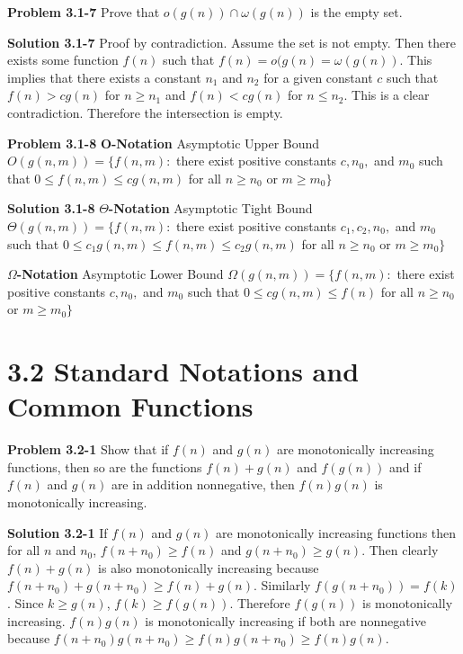 \documentclass{article}
\begin{document}
\hrulefill

\textbf{Problem 3.1-7} Prove that $o(g(n)) \cap \omega(g(n))$ is the empty set.

\medskip

\textbf{Solution 3.1-7} Proof by contradiction. Assume the set is not empty. Then there exists some function $f(n)$ such that $f(n) = o(g(n) = \omega(g(n))$. This implies that there exists a constant $n_1$ and $n_2$ for a given constant $c$ such that $f(n) > cg(n)$ for $n \geq n_1$ and $f(n) < cg(n)$ for $n \leq n_2$. This is a clear contradiction. Therefore the intersection is empty.

\hrulefill

\textbf{Problem 3.1-8} 
\textbf{O-Notation} Asymptotic Upper Bound
$O(g(n,m)) = \{f(n,m):$ there exist positive constants $c, n_0,$ and $m_0$ such that $0 \leq f(n,m) \leq cg(n,m)$ for all $n \geq n_0$ or $m \geq m_0\}$

\medskip


\textbf{Solution 3.1-8}
\textbf{$\Theta$-Notation} Asymptotic Tight Bound
$\Theta(g(n,m)) = \{f(n,m):$ there exist positive constants $c_1, c_2, n_0,$ and $m_0$ such that $0 \leq c_1g(n,m) \leq f(n,m) \leq c_2g(n,m)$ for all $n \geq n_0$ or $m \geq m_0 \}$

\medskip

\textbf{$\Omega$-Notation} Asymptotic Lower Bound
$\Omega(g(n,m)) = \{f(n,m):$ there exist positive constants $c, n_0,$ and $m_0$ such that $0 \leq cg(n,m) \leq f(n)$ for all $n \geq n_0$ or $m \geq m_0 \}$

\medskip

\hrulefill

\section*{3.2 Standard Notations and Common Functions}

\hrulefill

\medskip

\textbf{Problem 3.2-1} Show that if $f(n)$ and $g(n)$ are monotonically increasing functions, then so are the functions $f(n) + g(n)$ and $f(g(n))$ and if $f(n)$ and $g(n)$ are in addition nonnegative, then $f(n)g(n)$ is monotonically increasing.

\medskip

\textbf{Solution 3.2-1} If $f(n)$ and $g(n)$ are monotonically increasing functions then for all $n$ and $n_0$, $f(n+n_0) \geq f(n)$ and $g(n+n_0) \geq g(n)$. Then clearly $f(n) + g(n)$ is also monotonically increasing because $f(n+n_0) + g(n+n_0) \geq f(n) + g(n)$. Similarly $f(g(n + n_0)) = f(k)$. Since $k \geq g(n)$, $f(k) \geq f(g(n))$. Therefore $f(g(n))$ is monotonically increasing. $f(n)g(n)$ is monotonically increasing if both are nonnegative because $f(n+n_0)g(n+n_0) \geq f(n)g(n+n_0) \geq f(n)g(n)$.
\end{document}
